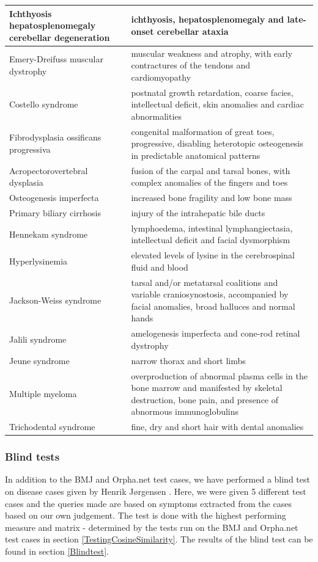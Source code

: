 \begin{table}[H]
\begin{scriptsize}
\begin{tabular}{| p{6cm} | p{6.5cm} |}
\hline
Ichthyosis hepatosplenomegaly cerebellar degeneration & ichthyosis, hepatosplenomegaly and late-onset cerebellar ataxia \\
\hline
Emery-Dreifuss muscular dystrophy & muscular weakness and atrophy, with early contractures of the tendons and cardiomyopathy \\
\hline
Costello syndrome & postnatal growth retardation, coarse facies, intellectual deficit, skin anomalies and cardiac abnormalities \\
\hline
Fibrodysplasia ossificans progressiva & congenital malformation of great toes, progressive, disabling heterotopic osteogenesis in predictable anatomical patterns \\
\hline
Acropectorovertebral dysplasia & fusion of the carpal and tarsal bones, with complex anomalies of the fingers and toes \\
\hline
Osteogenesis imperfecta & increased bone fragility and low bone mass \\
\hline
Primary biliary cirrhosis & injury of the intrahepatic bile ducts \\
\hline
Hennekam syndrome & lymphoedema, intestinal lymphangiectasia, intellectual deficit and facial dysmorphism \\
\hline
Hyperlysinemia & elevated levels of lysine in the cerebrospinal fluid and blood \\
\hline
Jackson-Weiss syndrome & tarsal and/or metatarsal coalitions and variable craniosynostosis, accompanied by facial anomalies, broad halluces and normal hands \\
\hline
Jalili syndrome & amelogenesis imperfecta and cone-rod retinal dystrophy \\
\hline
Jeune syndrome & narrow thorax and short limbs \\
\hline
Multiple myeloma & overproduction of abnormal plasma cells in the bone marrow and manifested by skeletal destruction, bone pain, and presence of abnormous immunoglobulins \\
\hline
Trichodental syndrome & fine, dry and short hair with dental anomalies \\
\hline
\end{tabular}
\end{scriptsize}
\end{table}

\subsubsection{Blind tests}
In addition to the BMJ and Orpha.net test cases, we have performed a
blind test on disease cases given by Henrik Jørgensen \cite{TheDude}. 
Here, we were given 5 different test cases and the queries made are 
based on symptoms extracted from the cases based on our own judgement.
The test is done with the highest performing measure and matrix - determined
by the tests run on the BMJ and Orpha.net test cases in section 
\ref{TestingCosineSimilarity}. The results of the blind test can be found
in section \ref{Blindtest}.

